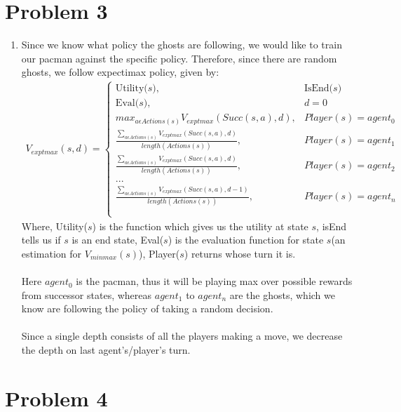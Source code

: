 \documentclass[12pt]{article}
\begin{document}
\section*{Problem 3}

\begin{enumerate}[label=(\alph*)]
  \item Since we know what policy the ghosts are following, we would like to train our pacman against the specific policy. Therefore, since there are random ghosts, we follow expectimax policy, given by:
  \begin{align*}
    V_{exptmax}(s, d) = \begin{cases} 
  \text{Utility($s$)}, & \text{IsEnd($s$)} \\
  \text{Eval($s$)}, & d = 0 \\
  max_{a\epsilon Actions(s)} V_{exptmax}(Succ(s, a), d), & Player(s) = agent_0 \\
  \frac{\sum_{a\epsilon Actions(s)} V_{exptmax}(Succ(s, a), d)}{length(Actions(s))}, & Player(s) = agent_1 \\
  \frac{\sum_{a\epsilon Actions(s)} V_{exptmax}(Succ(s, a), d)}{length(Actions(s))}, & Player(s) = agent_2 \\
  ... \\
  \frac{\sum_{a\epsilon Actions(s)} V_{exptmax}(Succ(s, a), d - 1)}{length(Actions(s))}, & Player(s) = agent_n \\ \\
  \end{cases}
  \end{align*}
    Where, Utility($s$) is the function which gives us the utility at state $s$, isEnd tells us if $s$ is an end state, Eval($s$) is the evaluation function for state $s$(an estimation for $V_{minmax}(s)$), Player($s$) returns whose turn it is. \\ \\
  Here $agent_0$ is the pacman, thus it will be playing max over possible rewards from successor states, whereas $agent_1$ to $agent_n$ are the ghosts, which we know are following the policy of taking a random decision. \\ \\
  Since a single depth consists of all the players making a move, we decrease the depth on last agent's/player's turn.
\end{enumerate}

\section*{Problem 4}
\end{document}
